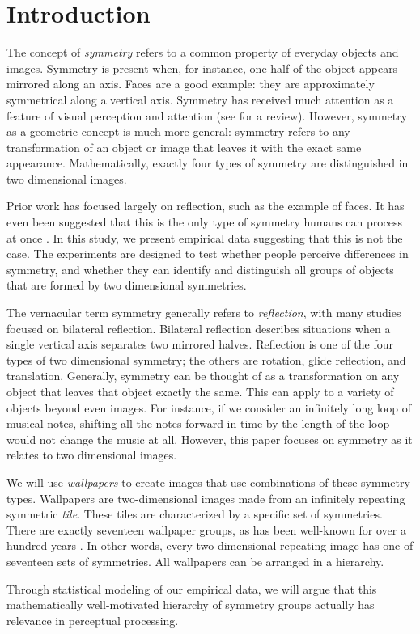 \section{Introduction}
The concept of \emph{symmetry} refers to a common property of everyday objects and images. 
Symmetry is present when, for instance, one half of the object appears mirrored along an axis. Faces are a good example: they are approximately symmetrical along a vertical axis. Symmetry has received much attention as a feature of visual perception and attention (see \cite{review} for a review). However, symmetry as a geometric concept is much more general: symmetry refers to any transformation of an object or image that leaves it with the exact same appearance. Mathematically, exactly four types of symmetry are distinguished in two dimensional images.

Prior work has focused largely on reflection, such as the example of faces. It has even been suggested that this is the only type of symmetry humans can process at once \citet{bio}. In this study, we present empirical data suggesting that this is not the case. The experiments are designed to test whether people perceive differences in symmetry, and whether they can identify and distinguish all groups of objects that are formed by two dimensional symmetries. 

The vernacular term symmetry generally refers to \emph{reflection}, with many studies focused on bilateral reflection. Bilateral reflection describes situations when a single vertical axis separates two mirrored halves. Reflection is one of the four types of two dimensional symmetry; the others are rotation, glide reflection, and translation. Generally, symmetry can be thought of as a transformation on any object that leaves that object exactly the same. This can apply to a variety of objects beyond even images. For instance, if we consider an infinitely long loop of musical notes, shifting all the notes forward in time by the length of the loop would not change the music at all. However, this paper focuses on symmetry as it relates to two dimensional images.

We will use \emph{wallpapers} to create images that use combinations of these symmetry types. Wallpapers are two-dimensional images made from an infinitely repeating symmetric \textit{tile}. These tiles are characterized by a specific set of symmetries. There are exactly seventeen wallpaper groups, as has been well-known for over a hundred years \citet{wallpaper-proof}. In other words, every two-dimensional repeating image has one of seventeen sets of symmetries. All wallpapers can be arranged in a hierarchy. 

Through statistical modeling of our empirical data, we will argue that this mathematically well-motivated hierarchy of symmetry groups actually has relevance in perceptual processing. 